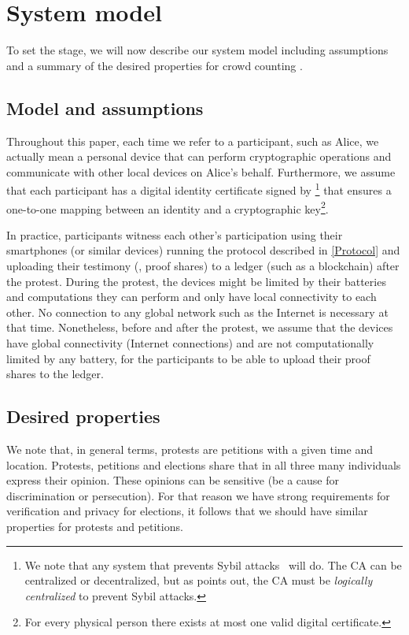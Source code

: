\section{System model}%
\label{system-model}

To set the stage, we will now describe our system model including
assumptions and a summary of the desired properties for crowd
counting%
.

\subsection{Model and assumptions}%
\label{assumptions}

Throughout this paper, each time we refer to a participant, such as Alice, we 
actually mean a personal device that can perform cryptographic operations and 
communicate with other local devices on Alice's behalf.
Furthermore, we assume that each participant has a digital identity certificate signed 
by \footnote{%
  We note that any system that prevents Sybil attacks~\cite{SybilAttack} will 
  do.
  The \ac{CA} can be centralized or decentralized, but as 
  \textcite{SybilAttack} points out, the \ac{CA} must be \emph{logically 
    centralized} to prevent Sybil attacks.
 } that ensures a one-to-one mapping between an identity and a cryptographic 
key\footnote{%
  For every physical person there exists at most one valid digital certificate.
}.

In practice, participants witness each other's participation using
their smartphones (or similar devices) running the protocol described
in \cref{Protocol} and uploading their testimony (\ie, proof shares)
to a ledger (such as a blockchain) after the protest.  During the
protest, the devices might be limited by their batteries and
computations they can perform and only have local connectivity to each
other.  No connection to any global network such as the Internet is
necessary at that time.  Nonetheless, before and after the protest, we
assume that the devices have global connectivity (\ie Internet
connections) and are not computationally limited by any battery, for
the participants to be able to upload their proof shares to the
ledger.

\subsection{Desired properties}%
\label{desired-properties}

We note that, in general terms, protests are petitions with a given time and 
location.
Protests, petitions and elections share that in all three many individuals 
express their opinion.
These opinions can be sensitive (\eg be a cause for discrimination or 
persecution).
For that reason we have strong requirements for verification and privacy for 
elections, it follows that we should have similar properties for protests
and petitions.

